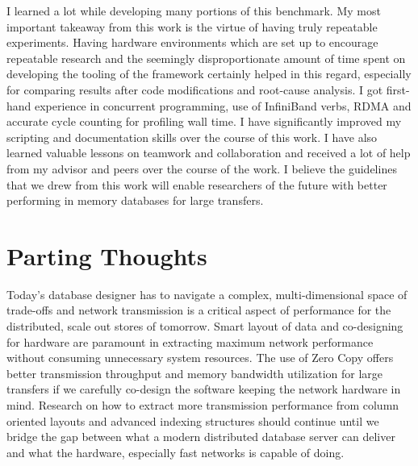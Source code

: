 I learned a lot while developing many portions of this benchmark. My most important takeaway from this work 
is the virtue of having truly repeatable experiments. Having hardware environments which are set up to encourage 
repeatable research and the seemingly disproportionate amount of time spent on developing the tooling of the 
framework certainly helped in this regard, especially for comparing results after code modifications and root-cause analysis.
I got first-hand experience in concurrent programming, use of InfiniBand verbs, RDMA and accurate cycle counting 
for profiling wall time. I have significantly improved my scripting and documentation skills over the course of this work. 
I have also learned valuable lessons on teamwork and collaboration and received a lot of help from my 
advisor and peers over the course of the work. I believe the guidelines that we drew from this work will 
enable researchers of the future with better performing in memory databases for large transfers. 

\section{Parting Thoughts}
Today's database designer has to navigate a complex, multi-dimensional space of trade-offs and network transmission 
is a critical aspect of performance for the distributed, scale out stores of tomorrow. Smart layout of data and  
co-designing for hardware are paramount in extracting maximum network performance without consuming 
unnecessary system resources. The use of Zero Copy offers better transmission throughput and memory bandwidth utilization for 
large transfers if we carefully co-design the software keeping the network hardware in mind. Research on how to extract 
more transmission performance from column oriented layouts and advanced indexing structures should continue until we bridge the 
gap between what a modern distributed database server can deliver and what the hardware, especially fast networks is capable of doing.